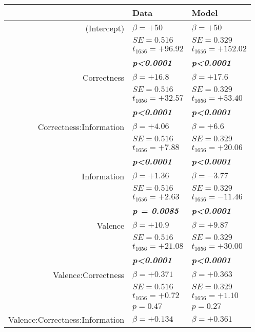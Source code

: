 % 
% 
\begin{table}
\centering \footnotesize
\begin{tabular}{r|ll}
\hline \hline
& \textbf{Data}& \textbf{Model} \\
\hline
\hline (Intercept)&$\beta=+50$&$\beta=+50$\\
&$SE=0.516$&$SE=0.329$\\
&$t_{1656}=+96.92$&$t_{1656}=+152.02$\\
&\textbf{\textit{p\textless0.0001}}&\textbf{\textit{p\textless0.0001}}\\
\hline Correctness&$\beta=+16.8$&$\beta=+17.6$\\
&$SE=0.516$&$SE=0.329$\\
&$t_{1656}=+32.57$&$t_{1656}=+53.40$\\
&\textbf{\textit{p\textless0.0001}}&\textbf{\textit{p\textless0.0001}}\\
\hline Correctness:Information&$\beta=+4.06$&$\beta=+6.6$\\
&$SE=0.516$&$SE=0.329$\\
&$t_{1656}=+7.88$&$t_{1656}=+20.06$\\
&\textbf{\textit{p\textless0.0001}}&\textbf{\textit{p\textless0.0001}}\\
\hline Information&$\beta=+1.36$&$\beta=-3.77$\\
&$SE=0.516$&$SE=0.329$\\
&$t_{1656}=+2.63$&$t_{1656}=-11.46$\\
&\textbf{\textit{p = 0.0085}}&\textbf{\textit{p\textless0.0001}}\\
\hline Valence&$\beta=+10.9$&$\beta=+9.87$\\
&$SE=0.516$&$SE=0.329$\\
&$t_{1656}=+21.08$&$t_{1656}=+30.00$\\
&\textbf{\textit{p\textless0.0001}}&\textbf{\textit{p\textless0.0001}}\\
\hline Valence:Correctness&$\beta=+0.371$&$\beta=+0.363$\\
&$SE=0.516$&$SE=0.329$\\
&$t_{1656}=+0.72$&$t_{1656}=+1.10$\\
&$p=0.47$&$p=0.27$\\
\hline Valence:Correctness:Information&$\beta=+0.134$&$\beta=+0.361$\\

\end{tabular}
\end{table}
